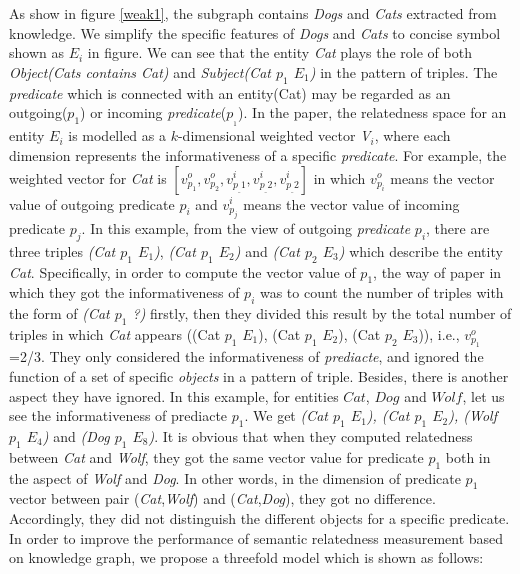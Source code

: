 As show in figure \ref{weak1}, the subgraph contains \emph{Dogs} and \emph{Cats} extracted from
knowledge. We simplify the specific features of \emph{Dogs} and \emph{Cats} to concise symbol shown as $E_i$ in figure. 
We can see that the entity \emph{Cat} plays the role 
of both \emph{Object(Cats contains Cat)} and \emph{Subject(Cat $p_1$ $E_1$)}
in the pattern of triples. The \emph{predicate} which is connected with an entity(Cat)
may be regarded as an outgoing($p_1$) or incoming \emph{predicate}($p_{_1}$).
In the paper\cite{aaai/Pirro12}, the relatedness space for an entity ${E_i}$ is modelled as a 
$k$-dimensional weighted vector \emph{V$_i$}, where each dimension represents
the informativeness of a specific \emph{predicate}.
For example, the weighted vector for \emph{Cat} is 
$[v_{p_1}^o, v_{p_2}^o, v_{p_\_1}^i, v_{p_\_2}^i, v_{p_\_2}^i]$ in which $v_{p_i}^o$ 
means the vector value of outgoing predicate $p_i$ and $v_{p_j}^i$ 
means the vector value of incoming predicate $p_j$.
In this example, from the view of outgoing \emph{predicate} $p_i$, there are three triples
\emph{(Cat $p_1$ $E_1$)}, \emph{(Cat $p_1$ $E_2$)} and \emph{(Cat $p_2$ $E_3$)} which describe the entity \emph{Cat}.
Specifically, in order to compute the vector value of $p_1$,
the way of paper \cite{aaai/Pirro12} in which they got the informativeness of $p_i$ was to count the number
of triples with the form of \emph{(Cat $p_1$ ?)} firstly, then they divided this result
by the total number of triples in which \emph{Cat} appears
((Cat $p_1$ $E_1$), (Cat $p_1$ $E_2$), (Cat $p_2$ $E_3$)), i.e., $v_{p_1}^o$=2/3.
They\cite{aaai/Pirro12} only considered the informativeness of \emph{prediacte},
and ignored the function of a set of specific \emph{objects} in a pattern of triple.
Besides, there is another aspect they have ignored. In this example, for entities $Cat$,
$Dog$ and $Wolf$, let us see the informativeness of prediacte $p_1$. We get
\emph{(Cat $p_1$ $E_1$), (Cat $p_1$ $E_2$), (Wolf $p_1$ $E_4$)} and \emph{(Dog $p_1$ $E_8$)}. 
It is obvious that when they\cite{aaai/Pirro12} computed relatedness between \emph{Cat} and \emph{Wolf}, 
they got the same vector value for predicate $p_1$ both in the aspect of \emph{Wolf} and \emph{Dog}.
In other words, in the dimension of predicate $p_1$ vector between pair (\emph{Cat},\emph{Wolf}) and
(\emph{Cat},\emph{Dog}), they got no difference. Accordingly, they did not distinguish the different
objects for a specific predicate. In order to improve the performance of 
semantic relatedness measurement based on knowledge graph, we propose a threefold model which is shown as follows:

